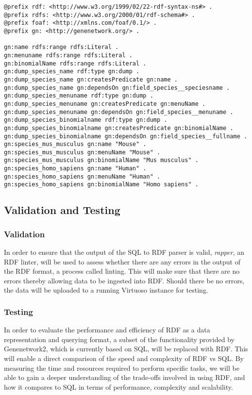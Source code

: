 \begin{verbatim}
@prefix rdf: <http://www.w3.org/1999/02/22-rdf-syntax-ns#> .
@prefix rdfs: <http://www.w3.org/2000/01/rdf-schema#> .
@prefix foaf: <http://xmlns.com/foaf/0.1/> .
@prefix gn: <http://genenetwork.org/> .

gn:name rdfs:range rdfs:Literal .
gn:menuname rdfs:range rdfs:Literal .
gn:binomialName rdfs:range rdfs:Literal .
gn:dump_species_name rdf:type gn:dump .
gn:dump_species_name gn:createsPredicate gn:name .
gn:dump_species_name gn:dependsOn gn:field_species__speciesname .
gn:dump_species_menuname rdf:type gn:dump .
gn:dump_species_menuname gn:createsPredicate gn:menuName .
gn:dump_species_menuname gn:dependsOn gn:field_species__menuname .
gn:dump_species_binomialname rdf:type gn:dump .
gn:dump_species_binomialname gn:createsPredicate gn:binomialName .
gn:dump_species_binomialname gn:dependsOn gn:field_species__fullname .
gn:species_mus_musculus gn:name "Mouse" .
gn:species_mus_musculus gn:menuName "Mouse" .
gn:species_mus_musculus gn:binomialName "Mus musculus" .
gn:species_homo_sapiens gn:name "Human" .
gn:species_homo_sapiens gn:menuName "Human" .
gn:species_homo_sapiens gn:binomialName "Homo sapiens" .
\end{verbatim}


\subsection{Validation and Testing}
\subsubsection*{Validation}
In order to ensure that the output of the SQL to RDF parser is valid, \textit{rapper}, an RDF linter, will be used to assess whether there are any errors in the output of the RDF format, a process called linting.  This will make sure that there are no errors thereby allowing data to be ingested into RDF.  Should there be no errors, the data will be uploaded to a running Virtuoso instance for testing.

\subsubsection*{Testing}

In order to evaluate the performance and efficiency of RDF as a data representation and querying format, a subset of the functionality provided by Genenetwork2, which is currently based on SQL, will be replaced with RDF.  This will enable a direct comparison of the speed and complexity of RDF vs SQL.  By measuring the time and resources required to perform specific tasks, we will be able to gain a deeper understanding of the trade-offs involved in using RDF, and how it compares to SQL in terms of performance, complexity and scalability.


